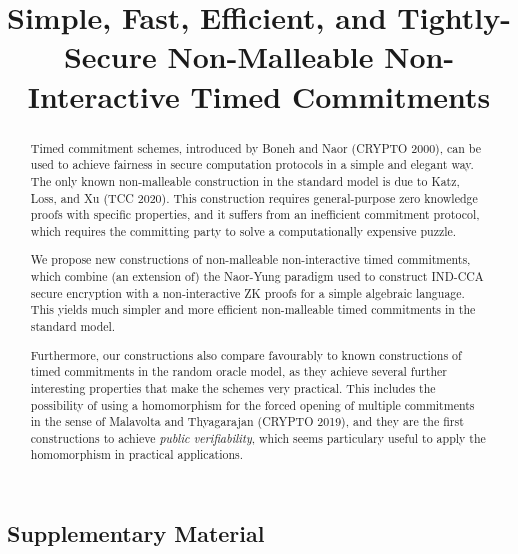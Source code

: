 \documentclass{llncs}
\author{\vspace{-5mm}}
\institute{\vspace{-5mm}}
\begin{document}
\title{Simple, Fast, Efficient, and Tightly-Secure Non-Malleable Non-Interactive Timed Commitments}


\maketitle
\begin{abstract}
Timed commitment schemes, introduced by Boneh and Naor (CRYPTO 2000), can be used to achieve fairness in secure computation protocols in a simple and elegant way.
The only known non-malleable construction in the standard model is due to Katz, Loss, and Xu (TCC 2020). This construction requires general-purpose zero knowledge proofs with specific properties, and it suffers from an inefficient commitment protocol, which requires the committing party to solve a computationally expensive puzzle.

We propose new constructions of non-malleable non-interactive timed commitments, which combine (an extension of) the Naor-Yung paradigm used to construct IND-CCA secure encryption with a non-interactive ZK proofs for a simple algebraic language. This yields much simpler and more efficient non-malleable timed commitments in the standard model.

Furthermore, our constructions also compare favourably to known constructions of timed commitments in the random oracle model, as they achieve several further interesting properties that make the schemes very practical. This includes the possibility of using a homomorphism for the forced opening of multiple commitments in the sense of Malavolta and Thyagarajan (CRYPTO 2019), and they are the first constructions to achieve \emph{public verifiability}, which seems particulary useful to apply the homomorphism in practical applications.
\end{abstract}


















\begin{appendix}
\chapter*{Supplementary Material}
%


\end{appendix}
\end{document}
